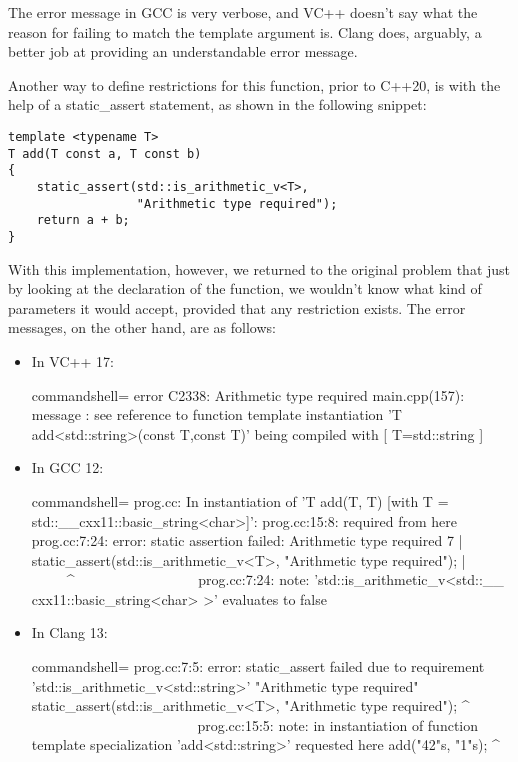 The error message in GCC is very verbose, and VC++ doesn’t say what the reason for failing to match the template argument is. Clang does, arguably, a better job at providing an understandable error message.

Another way to define restrictions for this function, prior to C++20, is with the help of a static\_assert statement, as shown in the following snippet:

\begin{lstlisting}[style=styleCXX]
template <typename T>
T add(T const a, T const b)
{
	static_assert(std::is_arithmetic_v<T>,
				  "Arithmetic type required");
	return a + b;
}
\end{lstlisting}

With this implementation, however, we returned to the original problem that just by looking at the declaration of the function, we wouldn’t know what kind of parameters it would accept, provided that any restriction exists. The error messages, on the other hand, are as follows:

\begin{itemize}
\item
In VC++ 17:

\begin{tcblisting}{commandshell={}}
error C2338: Arithmetic type required
main.cpp(157): message : see reference to function
template instantiation 'T add<std::string>(const T,const
T)' being compiled
     with
     [
         T=std::string
     ]
\end{tcblisting}

\item
In GCC 12:

\begin{tcblisting}{commandshell={}}
prog.cc: In instantiation of 'T add(T, T) [with T =
std::__cxx11::basic_string<char>]':
prog.cc:15:8: required from here
prog.cc:7:24: error: static assertion failed: Arithmetic
type required
    7 | static_assert(std::is_arithmetic_v<T>,
"Arithmetic type required");
      |                         ~~~~~^~~~~~~~~~~~~~~~~~
prog.cc:7:24: note: 'std::is_arithmetic_v<std::__
cxx11::basic_string<char> >' evaluates to false
\end{tcblisting}

\item
In Clang 13:

\begin{tcblisting}{commandshell={}}
prog.cc:7:5: error: static_assert failed due to
requirement 'std::is_arithmetic_v<std::string>'
"Arithmetic type required"
     static_assert(std::is_arithmetic_v<T>, "Arithmetic
type required");
     ^ ~~~~~~~~~~~~~~~~~~~~~~~
prog.cc:15:5: note: in instantiation of function template
specialization 'add<std::string>' requested here
    add("42"s, "1"s);
    ^
\end{tcblisting}
\end{itemize}

